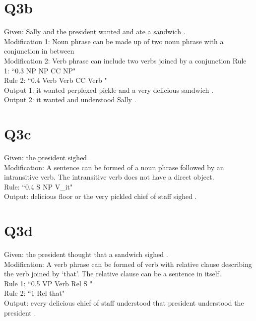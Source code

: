 \documentclass[12pt]{article}
\begin{document}
\section*{Q3b}
Given: Sally and the president wanted and ate a sandwich .\\
Modification 1: Noun phrase can be made up of two noun phrase with a conjunction in between\\
Modification 2: Verb phrase can include two verbs joined by a conjunction
Rule 1: ``0.3\hspace{1cm}	NP\hspace{1cm}	NP CC NP"\\
Rule 2: ``0.4\hspace{1cm}	Verb\hspace{1cm} Verb CC Verb "\\
Output 1: it wanted perplexed pickle and a very delicious sandwich .\\
Output 2: it wanted and understood Sally .\\
\pagebreak
\section*{Q3c}
Given: the president sighed .\\
Modification: A sentence can be formed of a noun phrase followed by an intransitive verb. The intransitive verb does not have a direct object.\\
Rule: ``0.4\hspace{1cm}	S\hspace{1cm}	NP V\_it"\\
Output: delicious floor or the very pickled chief of staff sighed .\\
\pagebreak
\section*{Q3d}
Given: the president thought that a sandwich sighed .\\
Modification: A verb phrase can be formed of verb with relative clause describing the verb joined by ‘that’. The relative clause can be a sentence in itself.\\
Rule 1: ``0.5\hspace{1cm}	VP\hspace{1cm}	Verb Rel S "\\
Rule 2: ``1\hspace{1cm}		Rel\hspace{1cm}	that"\\
Output: every delicious chief of staff understood that president understood the president .\\
\pagebreak
\end{document}
